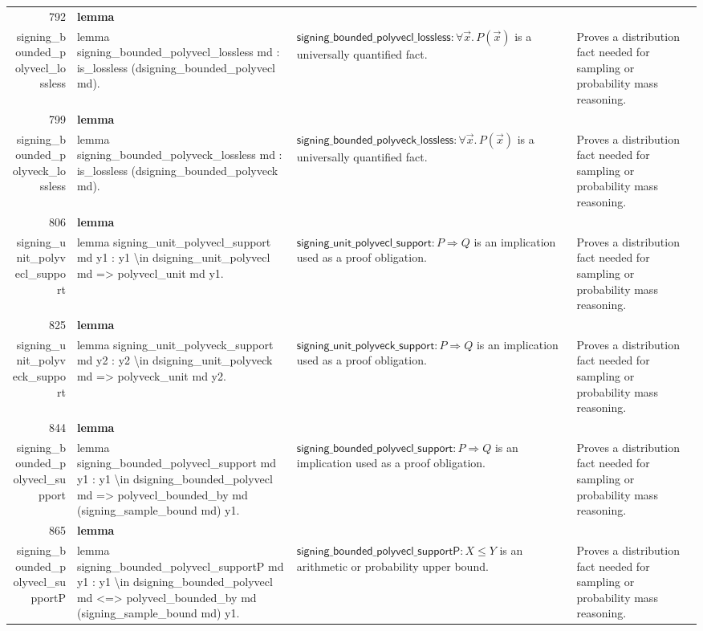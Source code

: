 \documentclass[10pt]{article}
\newcommand{\ec}[1]{\begingroup\ttfamily\scriptsize #1\endgroup}
\begin{document}
\begin{longtable}{r L{0.17\textwidth} L{0.26\textwidth} L{0.27\textwidth} L{0.20\textwidth}}
792 & \textbf{lemma}\\\ec{signing\_bounded\_polyvecl\_lossless} & \ec{lemma signing\_bounded\_polyvecl\_lossless md : is\_lossless (dsigning\_bounded\_polyvecl md).} & \(\mathsf{signing\_bounded\_polyvecl\_lossless} : \forall \vec{x}.\, P(\vec{x})\) is a universally quantified fact. & Proves a distribution fact needed for sampling or probability mass reasoning. \\
799 & \textbf{lemma}\\\ec{signing\_bounded\_polyveck\_lossless} & \ec{lemma signing\_bounded\_polyveck\_lossless md : is\_lossless (dsigning\_bounded\_polyveck md).} & \(\mathsf{signing\_bounded\_polyveck\_lossless} : \forall \vec{x}.\, P(\vec{x})\) is a universally quantified fact. & Proves a distribution fact needed for sampling or probability mass reasoning. \\
806 & \textbf{lemma}\\\ec{signing\_unit\_polyvecl\_support} & \ec{lemma signing\_unit\_polyvecl\_support md y1 : y1 \textbackslash{}in dsigning\_unit\_polyvecl md => polyvecl\_unit md y1.} & \(\mathsf{signing\_unit\_polyvecl\_support} : P \Rightarrow Q\) is an implication used as a proof obligation. & Proves a distribution fact needed for sampling or probability mass reasoning. \\
825 & \textbf{lemma}\\\ec{signing\_unit\_polyveck\_support} & \ec{lemma signing\_unit\_polyveck\_support md y2 : y2 \textbackslash{}in dsigning\_unit\_polyveck md => polyveck\_unit md y2.} & \(\mathsf{signing\_unit\_polyveck\_support} : P \Rightarrow Q\) is an implication used as a proof obligation. & Proves a distribution fact needed for sampling or probability mass reasoning. \\
844 & \textbf{lemma}\\\ec{signing\_bounded\_polyvecl\_support} & \ec{lemma signing\_bounded\_polyvecl\_support md y1 : y1 \textbackslash{}in dsigning\_bounded\_polyvecl md => polyvecl\_bounded\_by md (signing\_sample\_bound md) y1.} & \(\mathsf{signing\_bounded\_polyvecl\_support} : P \Rightarrow Q\) is an implication used as a proof obligation. & Proves a distribution fact needed for sampling or probability mass reasoning. \\
865 & \textbf{lemma}\\\ec{signing\_bounded\_polyvecl\_supportP} & \ec{lemma signing\_bounded\_polyvecl\_supportP md y1 : y1 \textbackslash{}in dsigning\_bounded\_polyvecl md <=> polyvecl\_bounded\_by md (signing\_sample\_bound md) y1.} & \(\mathsf{signing\_bounded\_polyvecl\_supportP} : X \le Y\) is an arithmetic or probability upper bound. & Proves a distribution fact needed for sampling or probability mass reasoning. \\

\end{longtable}
\end{document}
